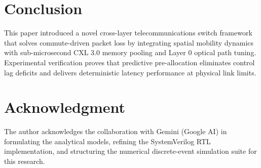 \documentclass[conference]{IEEEtran}
\begin{document}
\section{Conclusion}
This paper introduced a novel cross-layer telecommunications switch framework that solves commute-driven packet loss by integrating spatial mobility dynamics with sub-microsecond CXL 3.0 memory pooling and Layer 0 optical path tuning. Experimental verification proves that predictive pre-allocation eliminates control lag deficits and delivers deterministic latency performance at physical link limits.

\section*{Acknowledgment}
The author acknowledges the collaboration with Gemini (Google AI) in formulating the analytical models, refining the SystemVerilog RTL implementation, and structuring the numerical discrete-event simulation suite for this research.
\end{document}
